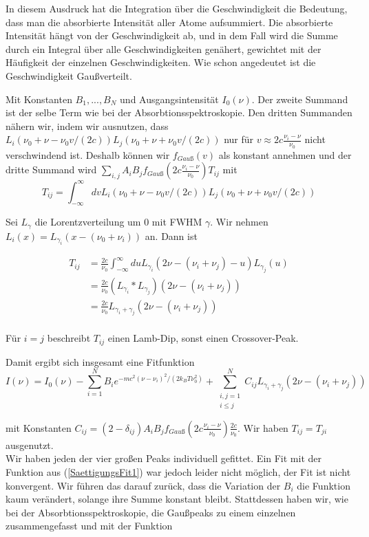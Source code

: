 \documentclass[a4paper,parskip]{scrartcl}
\begin{document}
In diesem Ausdruck hat die Integration über die Geschwindigkeit die Bedeutung, dass man die absorbierte Intensität aller Atome aufsummiert. Die absorbierte Intensität hängt von der Geschwindigkeit ab, und in dem Fall wird die Summe durch ein Integral über alle Geschwindigkeiten genähert, gewichtet mit der Häufigkeit der einzelnen Geschwindigkeiten. Wie schon angedeutet ist die Geschwindigkeit Gaußverteilt.

Mit Konstanten $B_1, ..., B_N$ und Ausgangsintensität $I_0(\nu)$. Der zweite Summand ist der selbe Term wie bei der Absorbtionsspektroskopie. Den dritten Summanden nähern wir, indem wir ausnutzen, dass  $L_i(\nu_0+\nu-\nu_0 v/(2c)) L_j(\nu_0+\nu+\nu_0 v/(2c))$ nur für $v \approx 2c \frac{\nu_i-\nu}{\nu_0}$ nicht verschwindend ist. Deshalb können wir $f_{Gauß}(v)$ als konstant annehmen und der dritte Summand wird $\sum_{i,j} A_iB_j f_{Gauß}(2c \frac{\nu_i-\nu}{\nu_0}) T_{ij}$ mit
$$T_{ij}=\int_{-\infty}^\infty dv L_i(\nu_0+\nu-\nu_0 v/(2c)) L_j(\nu_0+\nu+\nu_0 v/(2c))$$


Sei $L_\gamma$ die Lorentzverteilung um 0 mit FWHM $\gamma$. Wir nehmen $L_i(x) = L_{\gamma_i}(x-(\nu_0+\nu_i))$ an. Dann ist

\begin{align*}
T_{ij} &= \frac{2c}{\nu_0}\int_{-\infty}^\infty du L_{\gamma_i}(2\nu-(\nu_i+\nu_j)-u)L_{\gamma_j}(u)\\
&= \frac{2c}{\nu_0} (L_{\gamma_i} * L_{\gamma_j})(2\nu-(\nu_i+\nu_j)) \\
&= \frac{2c}{\nu_0} L_{\gamma_i+\gamma_j}(2\nu-(\nu_i+\nu_j)) \\
\end{align*}

Für $i=j$ beschreibt $T_{ij}$ einen Lamb-Dip, sonst einen Crossover-Peak. 

Damit ergibt sich insgesamt eine Fitfunktion
\begin{equation}
I(\nu) = I_0(\nu)-\sum_{i=1}^N B_i e^{-mc^2(\nu-\nu_i)^2/(2k_BT\nu_0^2)} +\sum_{\substack{i,j=1\\i\leq j}}^N C_{ij} L_{\gamma_i+\gamma_j}(2\nu-(\nu_i+\nu_j))
\label{SaettigungsFit1}
\end{equation}


mit Konstanten $C_{ij} = (2-\delta_{ij})A_iB_jf_{Gauß}(2c \frac{\nu_i-\nu}{\nu_0})\frac{2c}{\nu_0}$. Wir haben $T_{ij}=T_{ji}$ ausgenutzt.\\

Wir haben jeden der vier großen Peaks individuell gefittet. Ein Fit mit der Funktion aus (\ref{SaettigungsFit1}) war jedoch leider nicht möglich, der Fit ist nicht konvergent. Wir führen das darauf zurück, dass die Variation der $B_i$ die Funktion kaum verändert, solange ihre Summe konstant bleibt. Stattdessen haben wir, wie bei der Absorbtionsspektroskopie, die Gaußpeaks zu einem einzelnen zusammengefasst und mit der Funktion
\end{document}
